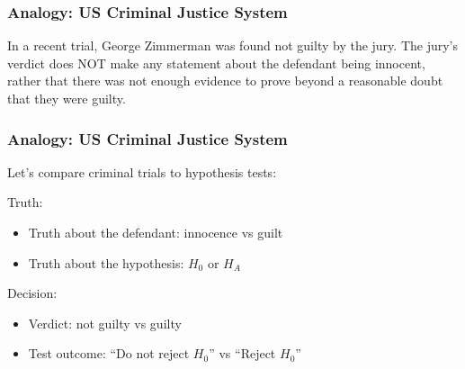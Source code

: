 \documentclass[handout]{beamer}
\newcommand{\blue}[1]{\textcolor{blue2}{#1}}
\begin{document}
\begin{frame}
\frametitle{Analogy:  US Criminal Justice System}


In a recent trial, George Zimmerman was found \blue{not guilty} by the jury.  The jury's verdict does NOT make any statement about the defendant being \blue{innocent}, rather that there was not enough evidence to prove beyond a reasonable doubt that they were guilty.

\end{frame}



\begin{frame}
\frametitle{Analogy:  US Criminal Justice System}

Let's compare criminal trials to hypothesis tests:

\vspace{0.5cm}

\pause \blue{Truth}:
\begin{itemize}
\pause \item Truth about the defendant: innocence vs guilt
\pause \item Truth about the hypothesis: $H_0$ or $H_A$
\end{itemize}

\vspace{0.25cm}

\pause \blue{Decision}:
\begin{itemize}
\pause \item Verdict:  not guilty vs guilty
\pause \item Test outcome: ``Do not reject $H_0$'' vs ``Reject $H_0$''
\end{itemize}

\end{frame}
\end{document}
